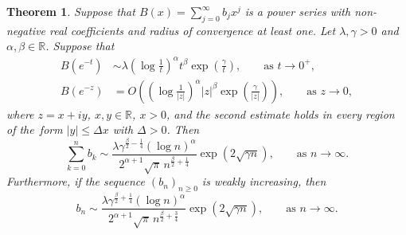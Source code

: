 \documentclass[12pt,a4paper]{amsart}
\numberwithin{equation}{section}
\theoremstyle{plain}
\newtheorem{thm}{Theorem}[section]
\theoremstyle{definition}
\theoremstyle{remark}
\newtheorem{re}[thm]{Remark}
\begin{document}
\begin{thm}\label{thm: BJSM}
Suppose that $B(x)=\sum_{j=0}^\infty b_jx^j$ is a power series with non-negative real coefficients and radius of convergence at least one. Let $\lambda,\gamma>0$ and $\alpha,\beta\in\mathbb{R}$. Suppose that
\begin{align*}
B(e^{-t})
&\sim
\lambda
\left(\log\frac1t\right)^\alpha
t^\beta
\exp\left(\frac{\gamma}{t}\right),
\qquad\text{as }t\to0^+,\\
B(e^{-z})
&=
O\left(
\left(\log\frac1{|z|}\right)^\alpha
|z|^\beta
\exp\left(\frac{\gamma}{|z|}\right)
\right),
\qquad\text{as }z\to0,
\end{align*}
where $z=x+iy$, $x,y\in\mathbb{R}$, $x>0$, and the second estimate holds in every region of the~form $|y|\le \Delta x$ with $\Delta>0$. Then
$$
\sum_{k=0}^n b_k
\sim
\frac{
\lambda\gamma^{\frac{\beta}{2}-\frac{1}{4}}(\log n)^\alpha
}{
2^{\alpha+1}\sqrt{\pi}\,
n^{\frac{\beta}{2}+\frac{1}{4}}
}
\exp\left(2\sqrt{\gamma n}\right),
\qquad\text{as }n\to\infty.
$$
Furthermore, if the sequence $(b_n)_{n\geq0}$ is weakly increasing, then
$$
b_n
\sim
\frac{
\lambda\gamma^{\frac{\beta}{2}+\frac{1}{4}}(\log n)^\alpha
}{
2^{\alpha+1}\sqrt{\pi}\,
n^{\frac{\beta}{2}+\frac{3}{4}}
}
\exp\left(2\sqrt{\gamma n}\right),
\qquad\text{as }n\to\infty.
$$
\end{thm}

\end{document}
